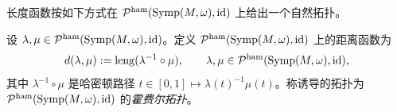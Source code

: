 长度函数按如下方式在
$\mathcal P^{\mathrm{ham}}(\operatorname{Symp}(M,\omega),\operatorname{id})$ 上给出一个自然拓扑。

\begin{definition}\label{def:hofer-topology-path-space}
设
$\lambda,\mu\in\mathcal P^{\mathrm{ham}}(\operatorname{Symp}(M,\omega),\operatorname{id})$。定义
$\mathcal P^{\mathrm{ham}}(\operatorname{Symp}(M,\omega),\operatorname{id})$ 上的距离函数为
\begin{equation}
 d(\lambda,\mu):=\operatorname{leng}(\lambda^{-1}\circ\mu),
 \qquad
 \lambda,\mu\in
 \mathcal P^{\mathrm{ham}}(\operatorname{Symp}(M,\omega),\operatorname{id}),
 \label{eq:hofer-path-distance}
\end{equation}
其中 $\lambda^{-1}\circ\mu$ 是哈密顿路径
$t\in[0,1]\mapsto\lambda(t)^{-1}\mu(t)$。称诱导的拓扑为
$\mathcal P^{\mathrm{ham}}(\operatorname{Symp}(M,\omega),\operatorname{id})$ 的\emph{霍费尔拓扑}。
\end{definition}
